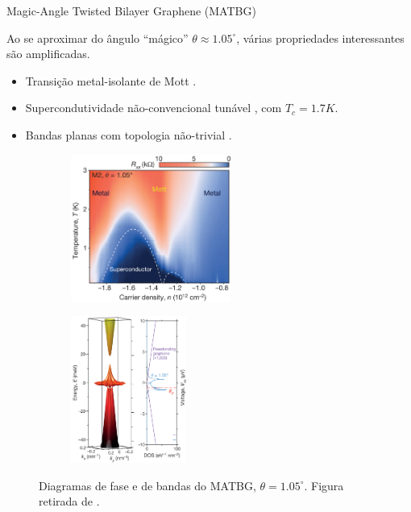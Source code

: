 \documentclass[8pt,aspectratio=169,xcolor={table,dvipsnames,usenames}]{beamer}
\begin{document}
\begin{frame}{Magic-Angle Twisted Bilayer Graphene (MATBG)}

Ao se aproximar do ângulo ``mágico'' $\theta \approx 1.05^\circ$, várias propriedades interessantes são amplificadas.
\begin{itemize}
\item Transição metal-isolante de Mott \cite{cao2018-insulator}.
\item Supercondutividade não-convencional tunável \cite{cao2018-superconductivity}, com $T_c = 1.7 \unit{K}$.
\item Bandas planas com topologia não-trivial \cite{rennella}.
\end{itemize}

\begin{figure}[H]
\centering
\begin{subfigure}{.58\textwidth}
  \centering
  \includegraphics[height=13em]{fig/matbg-superconductivity.png}
  \label{fig:matbg-superconductivity}
\end{subfigure}%
\quad
\begin{subfigure}{.38\textwidth}
  \centering
  \includegraphics[height=13em]{fig/matbg-bands.png}
  \label{fig:matbg-bands}
\end{subfigure}
\caption{Diagramas de fase e de bandas do MATBG, $\theta = 1.05^\circ$. Figura retirada de \cite{cao2018-superconductivity}.}
\label{fig:matbg-exp}
\end{figure}

\end{frame}
\end{document}
